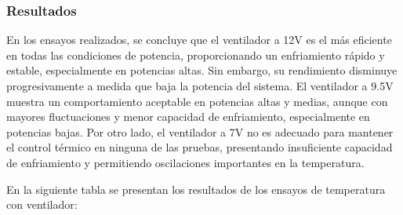 \documentclass[spanish, a4paper, 11pt]{article}
\begin{document}
\subsubsection{Resultados}

En los ensayos realizados, se concluye que el ventilador a 12V es el más eficiente en todas las condiciones de potencia, proporcionando un enfriamiento rápido y estable, especialmente en potencias altas. Sin embargo, su rendimiento disminuye progresivamente a medida que baja la potencia del sistema. El ventilador a 9.5V muestra un comportamiento aceptable en potencias altas y medias, aunque con mayores fluctuaciones y menor capacidad de enfriamiento, especialmente en potencias bajas. Por otro lado, el ventilador a 7V no es adecuado para mantener el control térmico en ninguna de las pruebas, presentando insuficiente capacidad de enfriamiento y permitiendo oscilaciones importantes en la temperatura. 



En la siguiente tabla se presentan los resultados de los ensayos de temperatura con ventilador:
\end{document}
